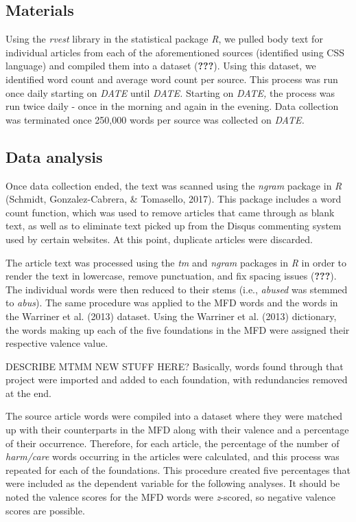 \documentclass[,man]{apa6}
\begin{document}
\hypertarget{materials}{%
\subsection{Materials}\label{materials}}

Using the \emph{rvest} library in the statistical package \emph{R}, we pulled body text for individual articles from each of the aforementioned sources (identified using CSS language) and compiled them into a dataset ({\textbf{???}}). Using this dataset, we identified word count and average word count per source. This process was run once daily starting on \emph{DATE} until \emph{DATE.} Starting on \emph{DATE,} the process was run twice daily - once in the morning and again in the evening. Data collection was terminated once 250,000 words per source was collected on \emph{DATE.}

\hypertarget{data-analysis}{%
\subsection{Data analysis}\label{data-analysis}}

Once data collection ended, the text was scanned using the \emph{ngram} package in \emph{R} (Schmidt, Gonzalez-Cabrera, \& Tomasello, 2017). This package includes a word count function, which was used to remove articles that came through as blank text, as well as to eliminate text picked up from the Disqus commenting system used by certain websites. At this point, duplicate articles were discarded.

The article text was processed using the \emph{tm} and \emph{ngram} packages in \emph{R} in order to render the text in lowercase, remove punctuation, and fix spacing issues ({\textbf{???}}). The individual words were then reduced to their stems (i.e., \emph{abused} was stemmed to \emph{abus}). The same procedure was applied to the MFD words and the words in the Warriner et al. (2013) dataset. Using the Warriner et al. (2013) dictionary, the words making up each of the five foundations in the MFD were assigned their respective valence value.

DESCRIBE MTMM NEW STUFF HERE? Basically, words found through that project were imported and added to each foundation, with redundancies removed at the end.

The source article words were compiled into a dataset where they were matched up with their counterparts in the MFD along with their valence and a percentage of their occurrence. Therefore, for each article, the percentage of the number of \emph{harm/care} words occurring in the articles were calculated, and this process was repeated for each of the foundations. This procedure created five percentages that were included as the dependent variable for the following analyses. It should be noted the valence scores for the MFD words were \emph{z}-scored, so negative valence scores are possible.
\end{document}
